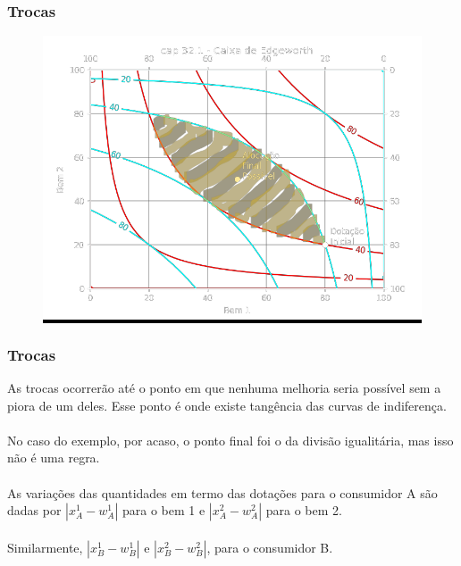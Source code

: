 \documentclass{beamer}[10]
\begin{document}
\begin{frame}
	\frametitle{Trocas}

	\begin{figure}[H]
		\centering
		\colorbox{black}{\includegraphics[scale=0.6]{cap32_11-caixa_edgeworth_1.png}}
	\end{figure}

\end{frame}

\begin{frame}
	\frametitle{Trocas}

	As trocas ocorrerão até o ponto em que nenhuma melhoria seria possível sem a piora de um deles. Esse ponto é onde existe tangência das curvas de indiferença.
	\\~\\
	No caso do exemplo, por acaso, o ponto final foi o da divisão igualitária, mas isso não é uma regra.
	\\~\\
	As variações das quantidades em termo das dotações para o consumidor A são dadas por $|x_A^1 - w_A^1|$ para o bem 1 e $|x_A^2 - w_A^2|$ para o bem 2. 
	\\~\\
	Similarmente, $|x_B^1 - w_B^1|$ e $|x_B^2 - w_B^2|$, para o consumidor B.

\end{frame}
\end{document}
